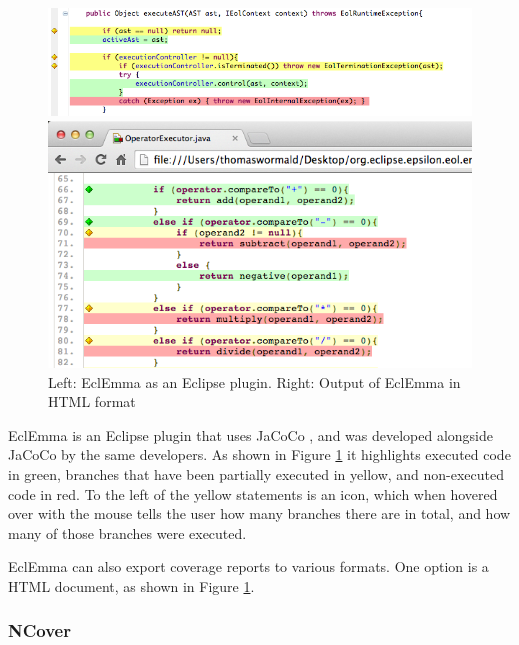 \begin{figure}
\begin{minipage}[b]{0.44\textwidth}
\centering
\includegraphics[width=0.9\linewidth]{figures/EclEmma}
\end{minipage}
\begin{minipage}[b]{0.1\textwidth}
\vspace{3.00mm}
\end{minipage}
\begin{minipage}[b]{0.44\textwidth}
\centering
\includegraphics[width=0.9\linewidth]{figures/EclEmmaHTML}
\end{minipage}
\caption{Left: EclEmma as an Eclipse plugin. Right: Output of EclEmma in HTML format}
\label{fig:eclemma}
\end{figure}

EclEmma is an Eclipse plugin that uses JaCoCo \cite{EclEmma}, and was developed alongside JaCoCo by the same developers. As shown in Figure \ref{fig:eclemma} it highlights executed code in green, branches that have been partially executed in yellow, and non-executed code in red. To the left of the yellow statements is an icon, which when hovered over with the mouse tells the user how many branches there are in total, and how many of those branches were executed.

EclEmma can also export coverage reports to various formats. One option is a HTML document, as shown in Figure \ref{fig:eclemma}.

\subsubsection{NCover}

